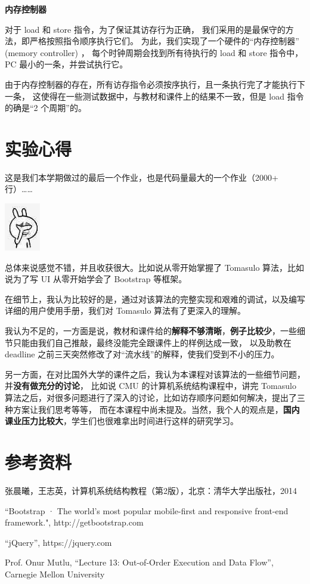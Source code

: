 \documentclass[11pt, a4paper]{article}
\begin{document}
\textbf{内存控制器}

对于 load 和 store 指令，为了保证其访存行为正确，
我们采用的是最保守的方法，即严格按照指令顺序执行它们。
为此，我们实现了一个硬件的“内存控制器” (memory controller) ，
每个时钟周期会找到所有待执行的 load 和 store 指令中，
PC 最小的一条，并尝试执行它。

由于内存控制器的存在，所有访存指令必须按序执行，且一条执行完了才能执行下一条，
这使得在一些测试数据中，与教材和课件上的结果不一致，但是 load 指令的确是“2 个周期”的。


\section{实验心得}

这是我们本学期做过的最后一个作业，也是代码量最大的一个作业（2000+ 行）……

\includegraphics{images/facepalm-1.png}

总体来说感觉不错，并且收获很大。比如说从零开始掌握了 Tomasulo 算法，比如说为了写 UI 从零开始学会了 Bootstrap 等框架。

在细节上，我认为比较好的是，通过对该算法的完整实现和艰难的调试，以及编写详细的用户使用手册，我们对 Tomasulo 算法有了更深入的理解。

我认为不足的，一方面是说，教材和课件给的\textbf{解释不够清晰}，\textbf{例子比较少}，一些细节只能由我们自己推敲，最终没能完全跟课件上的样例达成一致，
以及助教在 deadline 之前三天突然修改了对“流水线”的解释，使我们受到不小的压力。

另一方面，在对比国外大学的课件之后，我认为本课程对该算法的一些细节问题，并\textbf{没有做充分的讨论}，
比如说 CMU 的计算机系统结构课程中，讲完 Tomasulo 算法之后，对很多问题进行了深入的讨论，比如访存顺序问题如何解决，提出了三种方案让我们思考等等，
而在本课程中尚未提及。当然，我个人的观点是，\textbf{国内课业压力比较大}，学生们也很难拿出时间进行这样的研究学习。



\section*{参考资料}

\begin{enumerate}[{[}1{]}]
  \item 张晨曦，王志英，计算机系统结构教程（第2版），北京：清华大学出版社，2014
  \item ``Bootstrap · The world's most popular mobile-first and responsive front-end framework.", http://getbootstrap.com
  \item ``jQuery'', https://jquery.com
  \item Prof. Onur Mutlu, ``Lecture 13: Out-of-Order Execution and Data Flow'', Carnegie Mellon University
\end{enumerate}
\end{document}
